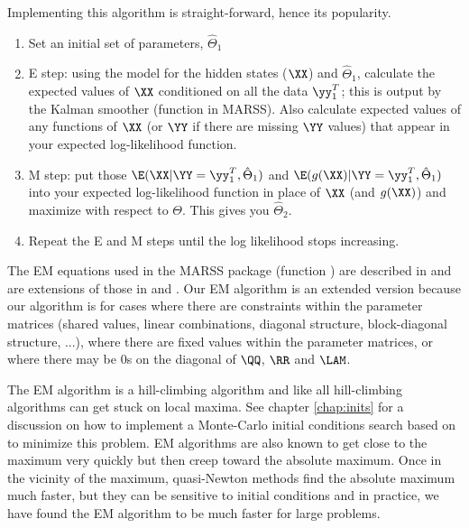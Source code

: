 Implementing this algorithm is straight-forward, hence its popularity.
\begin{enumerate}
	\item Set an initial set of parameters, $\hat{\Theta}_1$
	\item E step: using the model for the hidden states ($\XX$) and $\hat{\Theta}_1$, calculate the expected values of $\XX$ conditioned on all the data $\yy_1^T$; this is \verb@xtT@ output by the Kalman smoother (function \verb@MARSSkf@ in MARSS).  Also calculate expected values of any functions of $\XX$ (or $\YY$ if there are missing $\YY$ values) that appear in your expected log-likelihood function.
	\item M step: put those $\E(\XX | \YY=\yy_1^T, \hat{\Theta}_1)$ and $\E(g(\XX) | \YY=\yy_1^T, \hat{\Theta}_1)$ into your expected log-likelihood function in place of $\XX$ (and $g(\XX)$) and maximize with respect to $\Theta$.  This gives you $\hat{\Theta}_2$.
	\item Repeat the E and M steps until the log likelihood stops increasing.
\end{enumerate}

The EM equations used in the MARSS package (function \verb@MARSSkem@{}) are described in \citet{Holmes2010} and are extensions of those in \citet{ShumwayStoffer1982} and \citet{GhahramaniHinton1996}.  Our EM algorithm is an extended version because our algorithm is for cases where there are constraints within the parameter matrices (shared values, linear combinations, diagonal structure, block-diagonal structure, ...), where there are fixed values within the parameter matrices, or where there may be 0s on the diagonal of $\QQ$, $\RR$ and $\LAM$.

The EM algorithm is a hill-climbing algorithm and like all hill-climbing algorithms can get stuck on local maxima.  See chapter \ref{chap:inits} for a discussion on how to implement a Monte-Carlo initial conditions search based on \citet{Biernackietal2003} to minimize this problem.  EM algorithms are also known to get close to the maximum very quickly but then creep toward the absolute maximum.  Once in the vicinity of the maximum, quasi-Newton methods find the absolute maximum much faster, but they can be  sensitive to initial conditions and in practice, we have found the EM algorithm to be much faster for large problems.  


